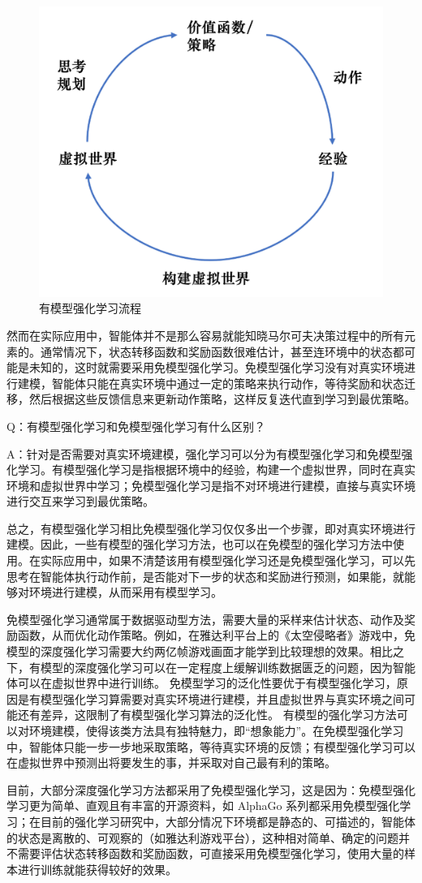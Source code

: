 \begin{figure}[htb]
    \centering
    \includegraphics[width=0.3\linewidth]{res/ch1/1.35}
    \caption{有模型强化学习流程}
    \label{fig:model-based rl}
\end{figure}

然而在实际应用中，智能体并不是那么容易就能知晓马尔可夫决策过程中的所有元素的。通常情况下，状态转移函数和奖励函数很难估计，甚至连环境中的状态都可能是未知的，这时就需要采用免模型强化学习。免模型强化学习没有对真实环境进行建模，智能体只能在真实环境中通过一定的策略来执行动作，等待奖励和状态迁移，然后根据这些反馈信息来更新动作策略，这样反复迭代直到学习到最优策略。

Q：有模型强化学习和免模型强化学习有什么区别？

A：针对是否需要对真实环境建模，强化学习可以分为有模型强化学习和免模型强化学习。有模型强化学习是指根据环境中的经验，构建一个虚拟世界，同时在真实环境和虚拟世界中学习；免模型强化学习是指不对环境进行建模，直接与真实环境进行交互来学习到最优策略。

总之，有模型强化学习相比免模型强化学习仅仅多出一个步骤，即对真实环境进行建模。因此，一些有模型的强化学习方法，也可以在免模型的强化学习方法中使用。在实际应用中，如果不清楚该用有模型强化学习还是免模型强化学习，可以先思考在智能体执行动作前，是否能对下一步的状态和奖励进行预测，如果能，就能够对环境进行建模，从而采用有模型学习。

免模型强化学习通常属于数据驱动型方法，需要大量的采样来估计状态、动作及奖励函数，从而优化动作策略。例如，在雅达利平台上的《太空侵略者》游戏中，免模型的深度强化学习需要大约两亿帧游戏画面才能学到比较理想的效果。相比之下，有模型的深度强化学习可以在一定程度上缓解训练数据匮乏的问题，因为智能体可以在虚拟世界中进行训练。
免模型学习的泛化性要优于有模型强化学习，原因是有模型强化学习算需要对真实环境进行建模，并且虚拟世界与真实环境之间可能还有差异，这限制了有模型强化学习算法的泛化性。
有模型的强化学习方法可以对环境建模，使得该类方法具有独特魅力，即“想象能力”。在免模型强化学习中，智能体只能一步一步地采取策略，等待真实环境的反馈；有模型强化学习可以在虚拟世界中预测出将要发生的事，并采取对自己最有利的策略。

目前，大部分深度强化学习方法都采用了免模型强化学习，这是因为：免模型强化学习更为简单、直观且有丰富的开源资料，如 AlphaGo 系列都采用免模型强化学习；在目前的强化学习研究中，大部分情况下环境都是静态的、可描述的，智能体的状态是离散的、可观察的（如雅达利游戏平台），这种相对简单、确定的问题并不需要评估状态转移函数和奖励函数，可直接采用免模型强化学习，使用大量的样本进行训练就能获得较好的效果。

